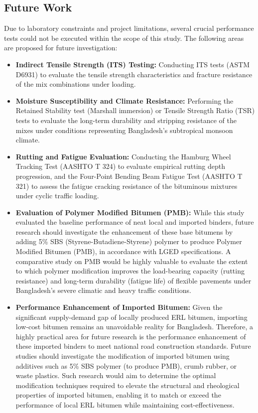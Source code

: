 \documentclass[12pt,a4paper]{article}
\begin{document}
\subsection{Future Work}
Due to laboratory constraints and project limitations, several crucial performance tests could not be executed within the scope of this study. The following areas are proposed for future investigation:
\begin{itemize}
    \item \textbf{Indirect Tensile Strength (ITS) Testing:} Conducting ITS tests (ASTM D6931) to evaluate the tensile strength characteristics and fracture resistance of the mix combinations under loading.
    \item \textbf{Moisture Susceptibility and Climate Resistance:} Performing the Retained Stability test (Marshall immersion) or Tensile Strength Ratio (TSR) tests to evaluate the long-term durability and stripping resistance of the mixes under conditions representing Bangladesh's subtropical monsoon climate.
    \item \textbf{Rutting and Fatigue Evaluation:} Conducting the Hamburg Wheel Tracking Test (AASHTO T 324) to evaluate empirical rutting depth progression, and the Four-Point Bending Beam Fatigue Test (AASHTO T 321) to assess the fatigue cracking resistance of the bituminous mixtures under cyclic traffic loading.
    \item \textbf{Evaluation of Polymer Modified Bitumen (PMB):} While this study evaluated the baseline performance of neat local and imported binders, future research should investigate the enhancement of these base bitumens by adding 5\% SBS (Styrene-Butadiene-Styrene) polymer to produce Polymer Modified Bitumen (PMB), in accordance with LGED specifications. A comparative study on PMB would be highly valuable to evaluate the extent to which polymer modification improves the load-bearing capacity (rutting resistance) and long-term durability (fatigue life) of flexible pavements under Bangladesh's severe climatic and heavy traffic conditions.
    \item \textbf{Performance Enhancement of Imported Bitumen:} Given the significant supply-demand gap of locally produced ERL bitumen, importing low-cost bitumen remains an unavoidable reality for Bangladesh. Therefore, a highly practical area for future research is the performance enhancement of these imported binders to meet national road construction standards. Future studies should investigate the modification of imported bitumen using additives such as 5\% SBS polymer (to produce PMB), crumb rubber, or waste plastics. Such research would aim to determine the optimal modification techniques required to elevate the structural and rheological properties of imported bitumen, enabling it to match or exceed the performance of local ERL bitumen while maintaining cost-effectiveness.
\end{itemize}
\end{document}
